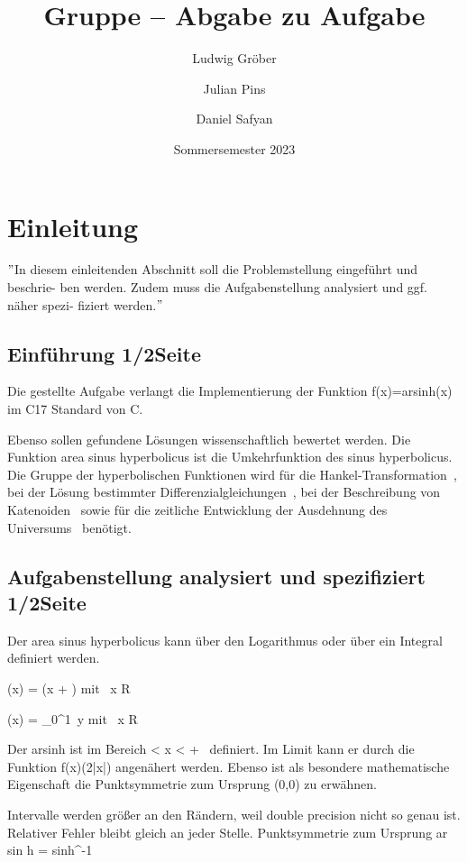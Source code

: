\documentclass[course=erap]{aspdoc}
\author{Ludwig Gröber \and Julian Pins \and Daniel Safyan}
\date{Sommersemester 2023} %
\title{Gruppe \theGroup{} -- Abgabe zu Aufgabe \theNumber}
\begin{document}
    \maketitle


    \section{Einleitung}
    \("\)In diesem einleitenden Abschnitt soll die Problemstellung eingeführt und beschrie- ben werden.
    Zudem muss die Aufgabenstellung analysiert und ggf. näher spezi- fiziert werden.\("\)\n

    \subsection{Einführung 1/2Seite}
    Die gestellte Aufgabe verlangt die Implementierung der Funktion f(x)=arsinh(x) im C17 Standard von C.


    Ebenso sollen gefundene Lösungen wissenschaftlich bewertet werden.
    Die Funktion area sinus hyperbolicus ist die Umkehrfunktion des sinus hyperbolicus.
    Die Gruppe der hyperbolischen Funktionen wird für die Hankel-Transformation~\cite{hankel},
    bei der Lösung bestimmter Differenzialgleichungen~\cite{differenzial}, bei der Beschreibung von Katenoiden~\cite{katenoid}
    sowie für die zeitliche Entwicklung der Ausdehnung des Universums~\cite{katenoid} benötigt.

    \subsection{Aufgabenstellung analysiert und spezifiziert 1/2Seite}
    Der area sinus hyperbolicus kann über den Logarithmus oder über ein Integral definiert werden.

    (x) = \ln \left(x +  \right) mit \, x \in R


    (x) = \int\_{0}^{1}  \,y mit \, x \in R


    Der arsinh ist im Bereich \infty < x < + \infty \, definiert.
    Im Limit kann er durch die Funktion f(x)\to \pm \ln(2|x|) angenähert werden.
    Ebenso ist als besondere mathematische Eigenschaft die Punktsymmetrie zum Ursprung (0,0) zu erwähnen.

    Intervalle werden größer an den Rändern, weil double precision nicht so genau ist.
    Relativer Fehler bleibt gleich an jeder Stelle.
    Punktsymmetrie zum Ursprung
    ar sin h = sinh^-1
\end{document}
